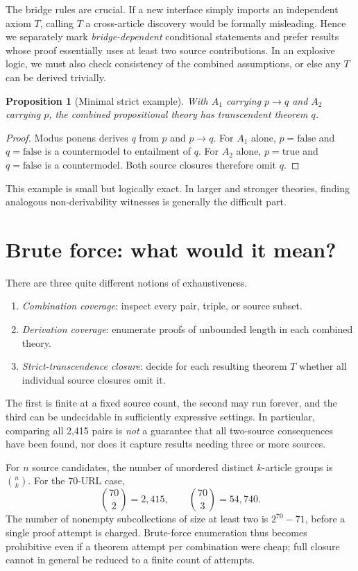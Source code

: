 \documentclass[11pt,letterpaper]{article}
\newtheorem{proposition}[theorem]{Proposition}
\begin{document}
The bridge rules are crucial. If a new interface simply imports an independent axiom $T$, calling $T$ a cross-article discovery would be formally misleading. Hence we separately mark \emph{bridge-dependent} conditional statements and prefer results whose proof essentially uses at least two source contributions. In an explosive logic, we must also check consistency of the combined assumptions, or else any $T$ can be derived trivially.

\begin{proposition}[Minimal strict example]
With $A_1$ carrying $p\to q$ and $A_2$ carrying $p$, the combined propositional theory has transcendent theorem $q$.
\end{proposition}
\begin{proof}
Modus ponens derives $q$ from $p$ and $p\to q$. For $A_1$ alone, $p=\mathrm{false}$ and $q=\mathrm{false}$ is a countermodel to entailment of $q$. For $A_2$ alone, $p=\mathrm{true}$ and $q=\mathrm{false}$ is a countermodel. Both source closures therefore omit $q$.
\end{proof}

This example is small but logically exact. In larger and stronger theories, finding analogous non-derivability witnesses is generally the difficult part.

\section{Brute force: what would it mean?}
There are three quite different notions of exhaustiveness.
\begin{enumerate}[label=(\roman*)]
\item \emph{Combination coverage}: inspect every pair, triple, or source subset.
\item \emph{Derivation coverage}: enumerate proofs of unbounded length in each combined theory.
\item \emph{Strict-transcendence closure}: decide for each resulting theorem $T$ whether all individual source closures omit it.
\end{enumerate}
The first is finite at a fixed source count, the second may run forever, and the third can be undecidable in sufficiently expressive settings. In particular, comparing all 2,415 pairs is \emph{not} a guarantee that all two-source consequences have been found, nor does it capture results needing three or more sources.

For $n$ source candidates, the number of unordered distinct $k$-article groups is $\binom{n}{k}$. For the 70-URL case,
\[
\binom{70}{2}=2,415,\qquad \binom{70}{3}=54,740.
\]
The number of nonempty subcollections of size at least two is $2^{70}-71$, before a single proof attempt is charged. Brute-force enumeration thus becomes prohibitive even if a theorem attempt per combination were cheap; full closure cannot in general be reduced to a finite count of attempts.
\end{document}
